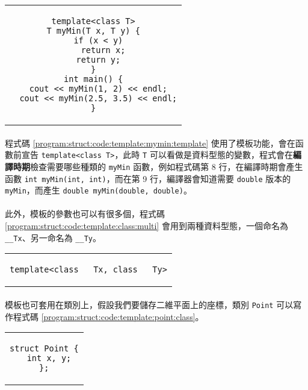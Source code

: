 \documentclass[12pt,a4paper,oneside]{report}
\begin{document}
\begin{CJK}{UTF8}{bkai}
\begin{code}[h!]
\centering
\begin{tabular}{c}
\begin{lstlisting}
template<class T>
T myMin(T x, T y) {
  if (x < y)
    return x;
  return y;
}
int main() {
  cout << myMin(1, 2) << endl;
  cout << myMin(2.5, 3.5) << endl;
}
\end{lstlisting}
\end{tabular}
\caption{使用 \lstinline!template! 的 \lstinline!myMin! 函數}
\label{program:struct:code:template:mymin:template}
\end{code}

\paragraph{}程式碼 \ref{program:struct:code:template:mymin:template} 使用了模板功能，會在函數前宣告 \lstinline!template<class T>!，此時 \lstinline!T! 可以看做是資料型態的變數，程式會在{\color{red}\textbf{編譯時期}}檢查需要哪些種類的 \lstinline!myMin! 函數，例如程式碼第 8 行，在編譯時期會產生函數 \lstinline!int myMin(int, int)!，而在第 9 行，編譯器會知道需要 \lstinline!double! 版本的 \lstinline!myMin!，而產生 \lstinline!double myMin(double, double)!。
\paragraph{}此外，模板的參數也可以有很多個，程式碼 \ref{program:struct:code:template:class:multi} 會用到兩種資料型態，一個命名為 \lstinline!__Tx!、另一命名為 \lstinline!__Ty!。

\begin{code}[h!]
\centering
\begin{tabular}{c}
\begin{lstlisting}
template<class __Tx, class __Ty>
\end{lstlisting}
\end{tabular}
\caption{使用兩種 \lstinline!class! 的模板}
\label{program:struct:code:template:class:multi}
\end{code}

\paragraph{}模板也可套用在類別上，假設我們要儲存二維平面上的座標，類別 \lstinline!Point! 可以寫作程式碼 \ref{program:struct:code:template:point:class}。

\begin{code}[h!]
\centering
\begin{tabular}{c}
\begin{lstlisting}
struct Point {
  int x, y;
};
\end{lstlisting}
\end{tabular}
\caption{\lstinline!Point! 類別}
\label{program:struct:code:template:point:class}
\end{code}


\end{CJK}
\end{document}
